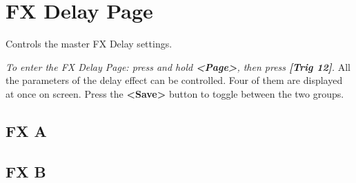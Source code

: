 \chapter{FX Delay Page}


Controls the master FX Delay settings.


\textit{To enter the FX Delay Page: press and hold \textbf{<Page>}, then press \textbf{[Trig 12]}.}
All the parameters of the delay effect can be controlled. Four of them are displayed at once on screen. Press the \textbf{<Save>} button to toggle between the two groups.

\section{FX A}

\newpage
\section{FX B}
